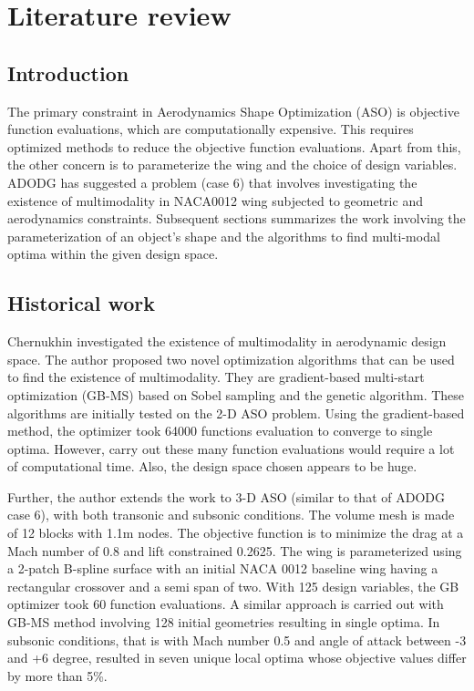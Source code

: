 \chapter{Literature review}
\label{literature}

\section{Introduction}
The primary constraint in Aerodynamics Shape Optimization (ASO) is objective function evaluations, which are computationally expensive. This requires optimized methods to reduce the objective function evaluations. Apart from this, the other concern is to parameterize the wing and the choice of design variables. ADODG has suggested a problem (case 6) that involves investigating the existence of multimodality in NACA0012 wing subjected to geometric and aerodynamics constraints. Subsequent sections summarizes the work involving the parameterization of an object's shape and the algorithms to find multi-modal optima within the given design space.

\section{Historical work}

Chernukhin \cite{oleg} investigated the existence of multimodality in aerodynamic design space. The author proposed two novel optimization algorithms that can be used to find the existence of multimodality. They are gradient-based multi-start optimization (GB-MS) based on Sobel sampling and the genetic algorithm. These algorithms are initially tested on the 2-D ASO problem. Using the gradient-based method, the optimizer took 64000 functions evaluation to converge to single optima. However, carry out these many function evaluations would require a lot of computational time. Also, the design space chosen appears to be huge.

Further, the author extends the work to 3-D ASO (similar to that of ADODG case 6), with both transonic and subsonic conditions. The volume mesh is made of 12 blocks with 1.1m nodes. The objective function is to minimize the drag at a Mach number of 0.8 and lift constrained 0.2625. The wing is parameterized using a 2-patch B-spline surface with an initial NACA 0012 baseline wing having a rectangular crossover and a semi span of two. With 125 design variables, the GB optimizer took 60 function evaluations. A similar approach is carried out with GB-MS method involving 128 initial geometries resulting in single optima. In subsonic conditions, that is with Mach number 0.5 and angle of attack between -3 and +6 degree, resulted in seven unique local optima whose objective values differ by more than 5\%. 

